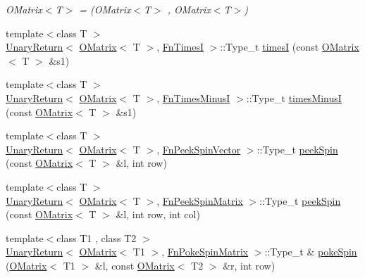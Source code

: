 \begin{DoxyCompactItemize}
\begin{DoxyCompactList}\small\item\em O\+Matrix$<$\+T$>$ = (O\+Matrix$<$\+T$>$ , O\+Matrix$<$\+T$>$) \end{DoxyCompactList}\item 
{\footnotesize template$<$class T $>$ }\\\mbox{\hyperlink{structENSEM_1_1UnaryReturn}{Unary\+Return}}$<$ \mbox{\hyperlink{classENSEM_1_1OMatrix}{O\+Matrix}}$<$ T $>$, \mbox{\hyperlink{structENSEM_1_1FnTimesI}{Fn\+TimesI}} $>$\+::Type\+\_\+t \mbox{\hyperlink{group__obsmatrix_ga988cbbcb7d182905bfc7bf8cda7543cf}{timesI}} (const \mbox{\hyperlink{classENSEM_1_1OMatrix}{O\+Matrix}}$<$ T $>$ \&s1)
\item 
{\footnotesize template$<$class T $>$ }\\\mbox{\hyperlink{structENSEM_1_1UnaryReturn}{Unary\+Return}}$<$ \mbox{\hyperlink{classENSEM_1_1OMatrix}{O\+Matrix}}$<$ T $>$, \mbox{\hyperlink{structENSEM_1_1FnTimesMinusI}{Fn\+Times\+MinusI}} $>$\+::Type\+\_\+t \mbox{\hyperlink{group__obsmatrix_ga2c4879d53ca01a4233b94574e3c93b4f}{times\+MinusI}} (const \mbox{\hyperlink{classENSEM_1_1OMatrix}{O\+Matrix}}$<$ T $>$ \&s1)
\item 
{\footnotesize template$<$class T $>$ }\\\mbox{\hyperlink{structENSEM_1_1UnaryReturn}{Unary\+Return}}$<$ \mbox{\hyperlink{classENSEM_1_1OMatrix}{O\+Matrix}}$<$ T $>$, \mbox{\hyperlink{structENSEM_1_1FnPeekSpinVector}{Fn\+Peek\+Spin\+Vector}} $>$\+::Type\+\_\+t \mbox{\hyperlink{group__obsmatrix_ga4d21a5274ec8135eea719a150bed1f7a}{peek\+Spin}} (const \mbox{\hyperlink{classENSEM_1_1OMatrix}{O\+Matrix}}$<$ T $>$ \&l, int row)
\item 
{\footnotesize template$<$class T $>$ }\\\mbox{\hyperlink{structENSEM_1_1UnaryReturn}{Unary\+Return}}$<$ \mbox{\hyperlink{classENSEM_1_1OMatrix}{O\+Matrix}}$<$ T $>$, \mbox{\hyperlink{structENSEM_1_1FnPeekSpinMatrix}{Fn\+Peek\+Spin\+Matrix}} $>$\+::Type\+\_\+t \mbox{\hyperlink{group__obsmatrix_ga5d47056fa4fb3fad4e48957e55c3cdec}{peek\+Spin}} (const \mbox{\hyperlink{classENSEM_1_1OMatrix}{O\+Matrix}}$<$ T $>$ \&l, int row, int col)
\item 
{\footnotesize template$<$class T1 , class T2 $>$ }\\\mbox{\hyperlink{structENSEM_1_1UnaryReturn}{Unary\+Return}}$<$ \mbox{\hyperlink{classENSEM_1_1OMatrix}{O\+Matrix}}$<$ T1 $>$, \mbox{\hyperlink{structENSEM_1_1FnPokeSpinMatrix}{Fn\+Poke\+Spin\+Matrix}} $>$\+::Type\+\_\+t \& \mbox{\hyperlink{group__obsmatrix_ga45420280324408e59bcbaca0ead5aa55}{poke\+Spin}} (\mbox{\hyperlink{classENSEM_1_1OMatrix}{O\+Matrix}}$<$ T1 $>$ \&l, const \mbox{\hyperlink{classENSEM_1_1OMatrix}{O\+Matrix}}$<$ T2 $>$ \&r, int row)

\end{DoxyCompactItemize}
